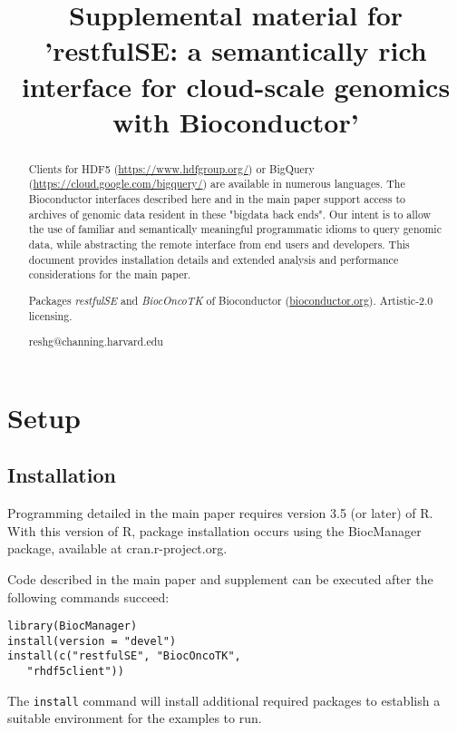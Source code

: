 \documentclass[applications]{gen-bioinformatics}
\author[1]{\pfnm{Shweta}
  \pinit{}
  \psnm{Gopaulakrishnan}}
\author[1]{\pfnm{Samuela}
  \pinit{}
  \psnm{Pollack}}
\author[1]{\pfnm{Benjamin}
  \pinit{}
  \psnm{Stubbs}}
\author[2]{\pfnm{Herv\'e}
  \pinit{}
  \psnm{Pag\`es}}
\author[3]{\pfnm{John}
  \pinit{}
  \psnm{Readey}}
\author[4]{\pfnm{Sean}
  \pinit{}
  \psnm{Davis}}
\author[5]{\pfnm{Levi}
  \pinit{}
  \psnm{Waldron}}
\author[6]{\pfnm{Martin}
  \pinit{T}
  \psnm{Morgan}}
\author[1]{\pfnm{Vincent}
  \pinit{J}
  \psnm{Carey}}
\newcommand{\BiocpackageFirst}[1]{{\textit{#1}}}
\begin{document}
\title{Supplemental material for 'restfulSE: a semantically rich interface for cloud-scale genomics
with Bioconductor'}
\maketitle

\begin{abstract}
\begin{subabstract}[Summary]
Clients for
HDF5 (\url{https://www.hdfgroup.org/}) or BigQuery (\url{https://cloud.google.com/bigquery/}) are available in numerous languages.
The
Bioconductor interfaces described here and
in the main paper support access to archives of genomic
data resident in these "bigdata back ends". 
Our intent is to allow the
use of familiar and semantically meaningful programmatic idioms
to query genomic data,
while abstracting the remote interface from end users
and developers.
This document provides installation details and extended
analysis and performance considerations for the main paper.
\end{subabstract}
\begin{subabstract}[Availability] Packages \BiocpackageFirst{restfulSE} and
\BiocpackageFirst{BiocOncoTK} of Bioconductor
 (\url {bioconductor.org}).  Artistic-2.0 licensing.  
\end{subabstract}
\begin{subabstract}[Contact]reshg@channing.harvard.edu
\end{subabstract}
\end{abstract}

\section*{Setup}
\subsection*{Installation}

Programming detailed in the main paper requires 
version 3.5 (or later) of R.  With this version
of R, package installation occurs using the
BiocManager package, available at cran.r-project.org.

Code described in the main paper and supplement can be 
executed after the following commands succeed:
\begin{verbatim}
library(BiocManager)
install(version = "devel")
install(c("restfulSE", "BiocOncoTK",
   "rhdf5client"))
\end{verbatim}
The \texttt{install} command will install additional
required packages to establish a suitable environment
for the examples to run.
\end{document}
